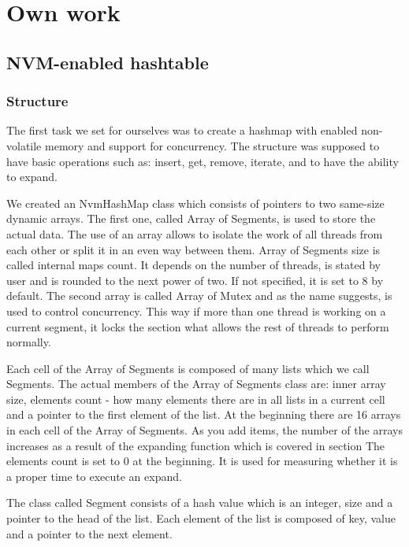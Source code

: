
\chapter{Own work}

\section{NVM-enabled hashtable}

\subsection{Structure}

    The first task we set for ourselves was to create a hashmap with enabled non-volatile memory and support for concurrency. The structure was supposed to have basic operations such as: insert, get, remove, iterate, and to have the ability to expand. 
    
    We created an NvmHashMap class which consists of pointers to two same-size dynamic arrays. The first one, called Array of Segments, is used to store the actual data. The use of an array allows to isolate the work of all threads from each other or split it in an even way between them. Array of Segments size is called internal maps count. It depends on the number of threads, is stated by user and is rounded to the next power of two. If not specified, it is set to 8 by default. The second array is called Array of Mutex and as the name suggests, is used to control concurrency. This way if more than one thread is working on a current segment, it locks the section what allows the rest of threads to perform normally. 
    
    Each cell of the Array of Segments is composed of many lists which we call Segments. The actual members of the Array of Segments class are: inner array size, elements count - how many elements there are in all lists in a current cell and a pointer to the first element of the list. 
    At the beginning there are 16 arrays in each cell of the Array of Segments. As you add items, the number of the arrays increases as a result of the expanding function which is covered in section %
    The elements count is set to 0 at the beginning. It is used for measuring whether it is a proper time to execute an expand.
    
    The class called Segment consists of a hash value which is an integer, size and a pointer to the head of the list. Each element of the list is composed of key, value and a pointer to the next element. 
    
